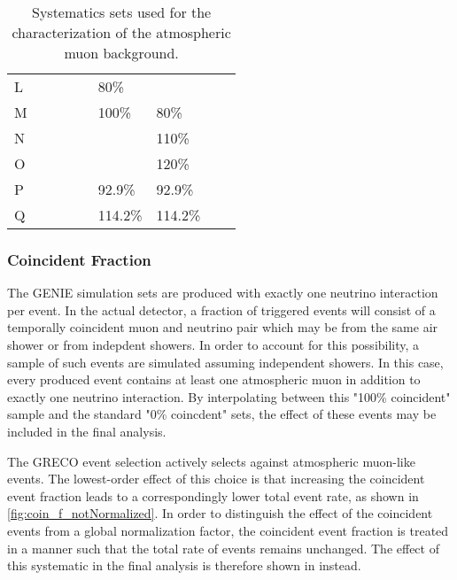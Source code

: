 \begin{landscape}
\begin{table}[]
\begin{tabular}{@{}lllllllll@{}}
L          &            &         &          &               & 80\%       &                  &          &                                        \\
M          &            &         &          &               & 100\%      & 80\%       &          &                                        \\
N          &            &         &          &               &                 & 110\%      &          &                                        \\
O          &            &         &          &               &                 & 120\%       &          &                                        \\
P          &            &         &          &               & 92.9\%     & 92.9\%     &          &                                        \\
Q          &            &         &          &               & 114.2\%   & 114.2\%    &          &                                        \\ \bottomrule
\end{tabular}
\caption{Systematics sets used for the characterization of the atmospheric muon background.}
\label{table:mgsets}
\end{table}
\end{landscape}


\subsubsection{Coincident Fraction}
\label{subsubsec:coin_fraction}
The GENIE simulation sets are produced with exactly one neutrino interaction per event. 
In the actual detector, a fraction of triggered events will consist of a temporally coincident muon and neutrino pair which may be from the same air shower or from indepdent showers.
In order to account for this possibility, a sample of such events are simulated assuming independent showers.
In this case, every produced event contains at least one atmospheric muon in addition to exactly one neutrino interaction.
By interpolating between this "100\% coincident" sample and the standard "0\% coincdent" sets, the effect of these events may be included in the final analysis.

The GRECO event selection actively selects against atmospheric muon-like events.
The lowest-order effect of this choice is that increasing the coincident event fraction leads to a correspondingly lower total event rate, as shown in \ref{fig:coin_f_notNormalized}.
In order to distinguish the effect of the coincident events from a global normalization factor, the coincident event fraction is treated in a manner such that the total rate of events remains unchanged. 
The effect of this systematic in the final analysis is therefore shown in  instead.

